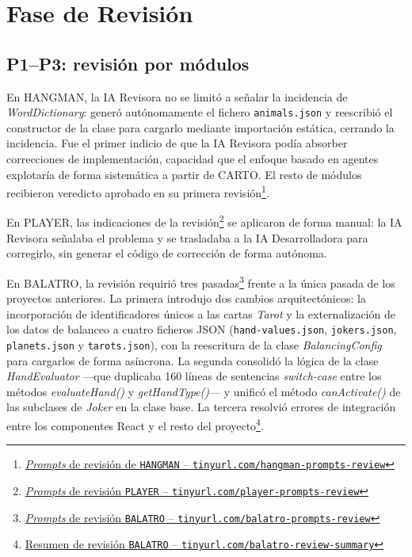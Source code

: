 \section{Fase de Revisión} \label{sec:dev-review}
\subsection{P1--P3: revisión por módulos}
En \ac{HANGMAN}, la \ac{IA} Revisora no se limitó a señalar la incidencia de \textit{WordDictionary}: generó autónomamente el fichero \texttt{animals.json} y reescribió el constructor de la clase para cargarlo mediante importación estática, cerrando la incidencia. 
Fue el primer indicio de que la IA Revisora podía absorber correcciones de implementación, capacidad que el enfoque basado en agentes explotaría de forma sistemática a partir de \ac{CARTO}. El resto de módulos recibieron veredicto aprobado en su primera revisión\footnote{\href{https://github.com/alu0101549491/TFG-Fabian-Gonzalez-Lence/tree/main/resources/prompts/1-TheHangmanGame/4-RevisionPorModulo}{\textit{Prompts} de revisión de \texttt{HANGMAN} -- \texttt{tinyurl.com/hangman-prompts-review}}}.

En \ac{PLAYER}, las indicaciones de la revisión\footnote{\href{https://github.com/alu0101549491/TFG-Fabian-Gonzalez-Lence/tree/main/resources/prompts/2-MusicWebPlayer/4-RevisionPorModulo}{\textit{Prompts} de revisión \texttt{PLAYER} -- \texttt{tinyurl.com/player-prompts-review}}} se aplicaron de forma manual: la \ac{IA} Revisora señalaba el problema y se trasladaba a la \ac{IA} Desarrolladora para corregirlo, sin generar el código de corrección de forma autónoma.

En \ac{BALATRO}, la revisión requirió tres pasadas\footnote{\href{https://github.com/alu0101549491/TFG-Fabian-Gonzalez-Lence/tree/main/resources/prompts/3-MiniBalatro/4-RevisionPorGrupodeModulos}{\textit{Prompts} de revisión \texttt{BALATRO} -- \texttt{tinyurl.com/balatro-prompts-review}}} frente a la única pasada de los proyectos anteriores. La primera introdujo dos cambios arquitectónicos: la incorporación de identificadores únicos a las cartas \textit{Tarot} y la externalización de los datos de balanceo a cuatro ficheros JSON (\texttt{hand-values.json}, \texttt{jokers.json}, \texttt{planets.json} y \texttt{tarots.json}), con la reescritura de la clase \textit{BalancingConfig} para cargarlos de forma asíncrona. La segunda consolidó la lógica de la clase \textit{HandEvaluator} ---que duplicaba 160 líneas de sentencias \textit{switch-case} entre los métodos \textit{evaluateHand()} y \textit{getHandType()}--- y unificó el método \textit{canActivate()} de las subclases de \textit{Joker} en la clase base. La tercera resolvió errores de integración entre los componentes React y el resto del proyecto\footnote{\href{https://github.com/alu0101549491/TFG-Fabian-Gonzalez-Lence/blob/main/projects/3-MiniBalatro/docs/CODE_REVIEW_SUMMARY.md}{Resumen de revisión \texttt{BALATRO} -- \texttt{tinyurl.com/balatro-review-summary}}}.


